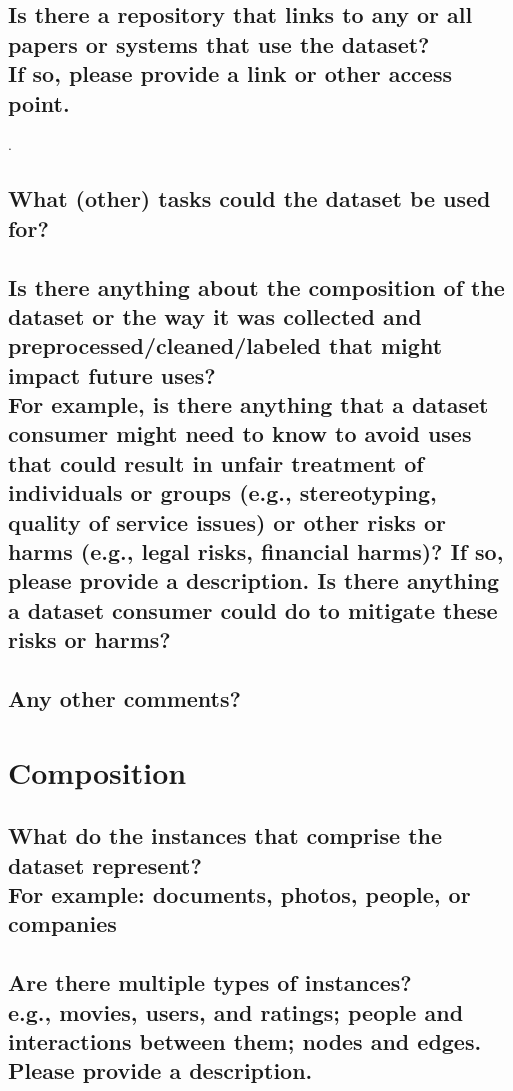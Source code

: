 \documentclass[letterpaper, 10 pt, conference]{ieeeconf}  %
\newcommand{\subtitle}[1]{{\\ \small \normalfont \color{purple} #1}}
\begin{document}
\lipsum[1]

\subsection{Is there a repository that links to any or all papers or systems that use the dataset? \subtitle{If so, please provide a link or other access point. }}

\lipsum[1].

\subsection{What (other) tasks could the dataset be used for?}

\lipsum[1]

\subsection{Is there anything about the composition of the dataset or the way it was collected and preprocessed/cleaned/labeled that might impact future uses? \subtitle{For example, is there anything that a dataset consumer might need to know to avoid uses that could result in unfair treatment of individuals or groups (e.g., stereotyping, quality of service issues) or other risks or harms (e.g., legal risks, financial harms)? If so, please provide a description. Is there anything a dataset consumer could do to mitigate these risks or harms?}}
\lipsum[1]

\subsection{Any other comments?}

\lipsum[1]

\section{Composition}

\subsection{What do the instances that comprise the dataset represent? \subtitle{For example: documents, photos, people, or companies}}

\lipsum[1]

\subsection{Are there multiple types of instances? \subtitle{e.g., movies, users, and ratings; people and interactions between them; nodes and edges. Please provide a description.}}
\end{document}
